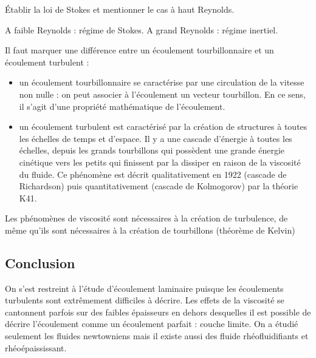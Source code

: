 Établir la loi de Stokes et mentionner le cas à haut Reynolds.

\begin{remarque}
A faible Reynolds : régime de Stokes.
A grand Reynolds : régime inertiel.
\end{remarque}

\begin{remarque}
Il faut marquer une différence entre un écoulement tourbillonnaire et un écoulement turbulent :
\begin{itemize}
\item un écoulement tourbillonnaire se caractérise par une circulation de la vitesse non nulle : on peut associer à l'écoulement un vecteur tourbillon.
En ce sens, il s'agit d'une propriété mathématique de l'écoulement.
\item un écoulement turbulent est caractérisé par la création de structures à toutes les échelles de temps et d'espace.
Il y a une cascade d'énergie à toutes les échelles, depuis les grands tourbillons qui possèdent une grande énergie cinétique vers les petits qui finissent par la dissiper en raison de la viscosité du fluide.
Ce phénomène est décrit qualitativement en 1922 (cascade de Richardson) puis quantitativement (cascade de Kolmogorov) par la théorie K41.
\end{itemize}
Les phénomènes de viscosité sont nécessaires à la création de turbulence, de même qu'ils sont nécessaires à la création de tourbillons (théorème de Kelvin)
\end{remarque}

\subsection*{Conclusion}
On s'est restreint à l'étude d'écoulement laminaire puisque les écoulements turbulents sont extrêmement difficiles à décrire.
Les effets de la viscosité se cantonnent parfois sur des faibles épaisseurs en dehors desquelles il est possible de décrire l'écoulement comme un écoulement parfait : couche limite.
On a étudié seulement les fluides newtowniens mais il existe aussi des fluide rhéofluidifiants et rhéoépaississant.

\newpage
